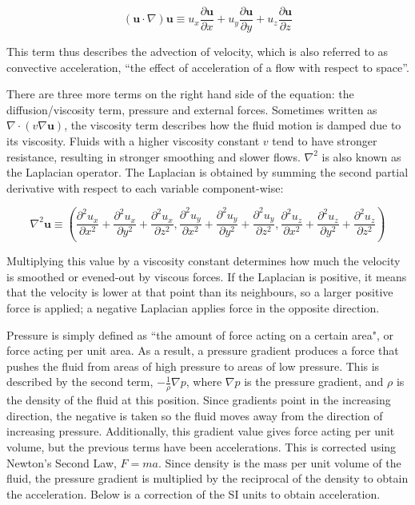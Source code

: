 \documentclass[12pt]{article}
\begin{document}
    \begin{equation*}
        (\textbf{u}\cdot\nabla)\textbf{u} \equiv u_x \frac{\partial \textbf{u}}{\partial x} + u_y \frac{\partial \textbf{u}}{\partial y} + u_z \frac{\partial \textbf{u}}{\partial z}
    \end{equation*}

    This term thus describes the advection of velocity, which is also referred to as convective acceleration, ``the effect of acceleration of a flow with respect to space''\cite{nswikipedia}.

    There are three more terms on the right hand side of the equation: the diffusion/viscosity term, pressure and external forces. Sometimes written as $\nabla \cdot (v\nabla\textbf{u})$, the viscosity term describes how the fluid motion is damped due to its viscosity. Fluids with a higher viscosity constant $v$ tend to have stronger resistance, resulting in stronger smoothing and slower flows. $\nabla^2$ is also known as the Laplacian operator. The Laplacian is obtained by summing the second partial derivative with respect to each variable component-wise:

    \begin{equation*}
        \nabla^2\textbf{u} \equiv (\frac{\partial^2{u_x}}{\partial{x^2}} + \frac{\partial^2{u_x}}{\partial{y^2}} + \frac{\partial^2{u_x}}{\partial{z^2}}, \frac{\partial^2{u_y}}{\partial{x^2}} + \frac{\partial^2{u_y}}{\partial{y^2}} + \frac{\partial^2{u_y}}{\partial{z^2}}, \frac{\partial^2{u_z}}{\partial{x^2}} + \frac{\partial^2{u_z}}{\partial{y^2}} + \frac{\partial^2{u_z}}{\partial{z^2}})
    \end{equation*}

    Multiplying this value by a viscosity constant determines how much the velocity is smoothed or evened-out by viscous forces. If the Laplacian is positive, it means that the velocity is lower at that point than its neighbours, so a larger positive force is applied; a negative Laplacian applies force in the opposite direction.

    Pressure is simply defined as ``the amount of force acting on a certain area"\cite{bbcbitesize}, or force acting per unit area. As a result, a pressure gradient produces a force that pushes the fluid from areas of high pressure to areas of low pressure. This is described by the second term, $-\frac{1}{\rho}\nabla{p}$, where $\nabla{p}$ is the pressure gradient, and $\rho$ is the density of the fluid at this position. Since gradients point in the increasing direction, the negative is taken so the fluid moves away from the direction of increasing pressure. Additionally, this gradient value gives force acting per unit volume, but the previous terms have been accelerations. This is corrected using Newton's Second Law, $F = ma$. Since density is the mass per unit volume of the fluid, the pressure gradient is multiplied by the reciprocal of the density to obtain the acceleration. Below is a correction of the SI units to obtain acceleration.
\end{document}
